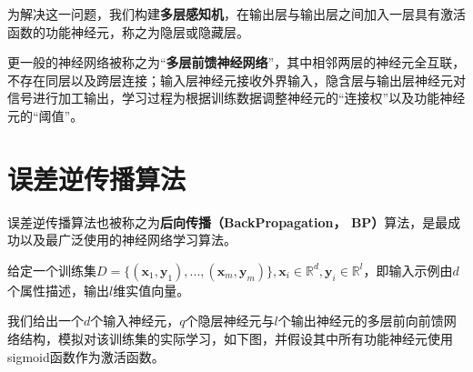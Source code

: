 为解决这一问题，我们构建\textbf{多层感知机}，在输出层与输出层之间加入一层具有激活函数的功能神经元，称之为隐层或隐藏层。

更一般的神经网络被称之为“\textbf{多层前馈神经网络}”，其中相邻两层的神经元全互联，不存在同层以及跨层连接；输入层神经元接收外界输入，隐含层与输出层神经元对信号进行加工输出，学习过程为根据训练数据调整神经元的“连接权”以及功能神经元的“阈值”。

\section{误差逆传播算法}\label{sec:5.4}
误差逆传播算法也被称之为\textbf{后向传播（BackPropagation， BP）}算法，是最成功以及最广泛使用的神经网络学习算法。

给定一个训练集$D = \{(\boldsymbol x_1, \boldsymbol y_1), ..., (\boldsymbol x_m, \boldsymbol y_m)\}, \boldsymbol x_i\in \mathbb{R}^d, \boldsymbol y_i\in \mathbb{R}^l$，即输入示例由$d$个属性描述，输出$l$维实值向量。


我们给出一个$d$个输入神经元，$q$个隐层神经元与$l$个输出神经元的多层前向前馈网络结构，模拟对该训练集的实际学习，如下图，并假设其中所有功能神经元使用sigmoid函数作为激活函数。

\begin{figure}[!htbp]
	\centering
\end{figure}

